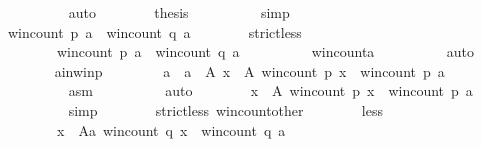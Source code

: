 \begin{isabellebody}
\ \ \ \ \ \ \ \ \isamarkupfalse%
\ auto\isanewline
\ \ \ \ \ \ \isamarkupfalse%
\ {\isacharquery}{\kern0pt}thesis\isanewline
\ \ \ \ \ \ \ \ \isamarkupfalse%
\ simp\isanewline
\ \ \ \ \isamarkupfalse%
\isanewline
\ \ \ \ \ \ \isamarkupfalse%
\ {\isachardoublequoteopen}win{\isacharunderscore}{\kern0pt}count\ p\ a\ {\isasymnoteq}\ win{\isacharunderscore}{\kern0pt}count\ q\ a{\isachardoublequoteclose}\isanewline
\ \ \ \ \ \ \isamarkupfalse%
\ strict{\isacharunderscore}{\kern0pt}less{\isacharcolon}{\kern0pt}\isanewline
\ \ \ \ \ \ \ \ {\isachardoublequoteopen}win{\isacharunderscore}{\kern0pt}count\ p\ a\ {\isacharless}{\kern0pt}\ win{\isacharunderscore}{\kern0pt}count\ q\ a{\isachardoublequoteclose}\isanewline
\ \ \ \ \ \ \ \ \isamarkupfalse%
\ win{\isacharunderscore}{\kern0pt}count{\isacharunderscore}{\kern0pt}a\isanewline
\ \ \ \ \ \ \ \ \isamarkupfalse%
\ auto\isanewline
\ \ \ \ \ \ \isamarkupfalse%
\ a{\isacharunderscore}{\kern0pt}in{\isacharunderscore}{\kern0pt}win{\isacharunderscore}{\kern0pt}p{\isacharcolon}{\kern0pt}\isanewline
\ \ \ \ \ \ \ \ {\isachardoublequoteopen}a\ {\isasymin}\ {\isacharbraceleft}{\kern0pt}a\ {\isasymin}\ A{\isachardot}{\kern0pt}\ {\isasymforall}x\ {\isasymin}\ A{\isachardot}{\kern0pt}\ win{\isacharunderscore}{\kern0pt}count\ p\ x\ {\isasymle}\ win{\isacharunderscore}{\kern0pt}count\ p\ a{\isacharbraceright}{\kern0pt}{\isachardoublequoteclose}\isanewline
\ \ \ \ \ \ \ \ \isamarkupfalse%
\ asm{}\isanewline
\ \ \ \ \ \ \ \ \isamarkupfalse%
\ auto\isanewline
\ \ \ \ \ \ \isamarkupfalse%
\ {\isachardoublequoteopen}{\isasymforall}x\ {\isasymin}\ A{\isachardot}{\kern0pt}\ win{\isacharunderscore}{\kern0pt}count\ p\ x\ {\isasymle}\ win{\isacharunderscore}{\kern0pt}count\ p\ a{\isachardoublequoteclose}\isanewline
\ \ \ \ \ \ \ \ \isamarkupfalse%
\ simp\isanewline
\ \ \ \ \ \ \isamarkupfalse%
\ strict{\isacharunderscore}{\kern0pt}less\ win{\isacharunderscore}{\kern0pt}count{\isacharunderscore}{\kern0pt}other\isanewline
\ \ \ \ \ \ \isamarkupfalse%
\ less{\isacharcolon}{\kern0pt}\isanewline
\ \ \ \ \ \ \ \ {\isachardoublequoteopen}{\isasymforall}x\ {\isasymin}\ A{\isacharminus}{\kern0pt}{\isacharbraceleft}{\kern0pt}a{\isacharbraceright}{\kern0pt}{\isachardot}{\kern0pt}\ win{\isacharunderscore}{\kern0pt}count\ q\ x\ {\isacharless}{\kern0pt}\ win{\isacharunderscore}{\kern0pt}count\ q\ a{\isachardoublequoteclose}\isanewline

\end{isabellebody}
